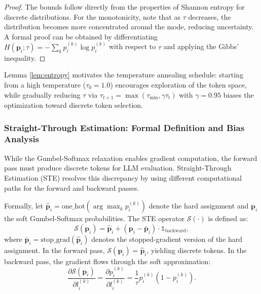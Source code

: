 \documentclass[preprint,12pt]{elsarticle}
\begin{document}
\begin{proof}
The bounds follow directly from the properties of Shannon entropy for discrete distributions. For the monotonicity, note that as $\tau$ decreases, the distribution becomes more concentrated around the mode, reducing uncertainty. A formal proof can be obtained by differentiating $H(\mathbf{p}_i; \tau) = -\sum_k p_i^{(k)} \log p_i^{(k)}$ with respect to $\tau$ and applying the Gibbs' inequality.
\end{proof}

Lemma \ref{lem:entropy} motivates the temperature annealing schedule: starting from a high temperature ($\tau_0 = 1.0$) encourages exploration of the token space, while gradually reducing $\tau$ via $\tau_{t+1} = \max(\tau_{\min}, \gamma \tau_t)$ with $\gamma = 0.95$ biases the optimization toward discrete token selection.

\subsubsection{Straight-Through Estimation: Formal Definition and Bias Analysis}
\label{sec:ste}

While the Gumbel-Softmax relaxation enables gradient computation, the forward pass must produce discrete tokens for LLM evaluation. Straight-Through Estimation (STE) \cite{bengio2013estimating} resolves this discrepancy by using different computational paths for the forward and backward passes.

Formally, let $\hat{\mathbf{p}}_i = \text{one\_hot}(\arg\max_k p_i^{(k)})$ denote the hard assignment and $\mathbf{p}_i$ the soft Gumbel-Softmax probabilities. The STE operator $\mathcal{S}(\cdot)$ is defined as:
\begin{equation}
\label{eq:ste}
\mathcal{S}(\mathbf{p}_i) = \hat{\mathbf{p}}_i + (\mathbf{p}_i - \bar{\mathbf{p}}_i) \cdot \mathbb{1}_{\text{backward}},
\end{equation}
where $\bar{\mathbf{p}}_i = \text{stop\_grad}(\hat{\mathbf{p}}_i)$ denotes the stopped-gradient version of the hard assignment. In the forward pass, $\mathcal{S}(\mathbf{p}_i) = \hat{\mathbf{p}}_i$, yielding discrete tokens. In the backward pass, the gradient flows through the soft approximation:
\begin{equation}
\label{eq:ste_gradient}
\frac{\partial \mathcal{S}(\mathbf{p}_i)}{\partial l_i^{(k)}} = \frac{\partial p_i^{(k)}}{\partial l_i^{(k)}} = \frac{1}{\tau} p_i^{(k)} \left(1 - p_i^{(k)}\right).
\end{equation}
\end{document}
